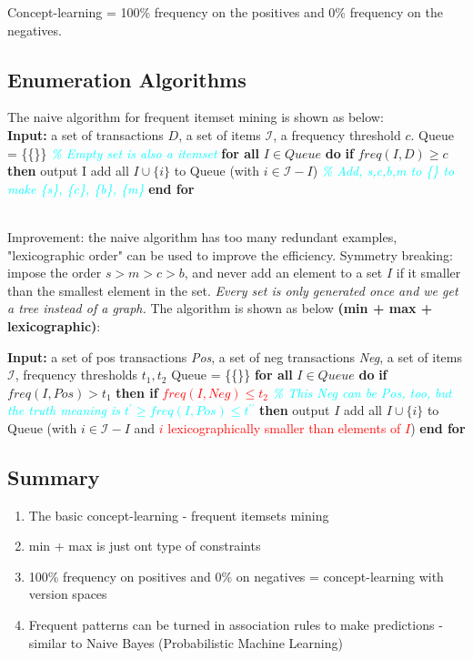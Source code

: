 \noindent
Concept-learning = 100\% frequency on the positives and 0\% frequency on the negatives.

\subsection{Enumeration Algorithms}
The naive algorithm for frequent itemset mining is shown as below: \\
\tabto{0mm} \textbf{Input:}
\tabto{5mm} a set of transactions $D$,
\tabto{5mm} a set of items $\mathscr{I}$,
\tabto{5mm} a frequency threshold $c$.
\tabto{0mm} Queue = \{\{\}\} \textcolor{cyan}{\emph{\% Empty set is also a itemset}}
\tabto{0mm} \textbf{for all} $I \in Queue$ \textbf{do}
\tabto{5mm} \textbf{if} $freq(I,D) \ge c$
\tabto{10mm} \textbf{then} output I
\tabto{10mm} add all $I \cup \{i\}$ to Queue (with $i \in \mathscr{I} - I$) \textcolor{cyan}{\emph{\% Add, s,c,b,m to \{\} to make \{s\}, \{c\}, \{b\}, \{m\}}}
\tabto{0mm} \textbf{end for}

\noindent
\\ Improvement: the naive algorithm has too many redundant examples, "lexicographic order" can be used to improve the efficiency. Symmetry breaking: impose the order $s > m > c > b$, and never add an element to a set $I$ if it smaller than the smallest element in the set. \emph{Every set is only generated once and we get a tree instead of a graph.} The algorithm is shown as below \textbf{(min + max + lexicographic)}:

\tabto{0mm} \textbf{Input:}
\tabto{5mm} a set of pos transactions \emph{Pos},
\tabto{5mm} a set of neg transactions \emph{Neg},
\tabto{5mm} a set of items $\mathscr{I}$,
\tabto{5mm} frequency thresholds $t_{1}, t_{2}$
\tabto{0mm} Queue = \{\{\}\}
\tabto{0mm} \textbf{for all} $I \in Queue$ \textbf{do}
\tabto{5mm} \textbf{if} $freq(I, Pos) > t_{1}$
\tabto{10mm} \textbf{then if} \textcolor{red}{$freq(I, Neg) \le t_{2}$} \textcolor{cyan}{\emph{\% This Neg can be Pos, too, but the truth meaning is $t^{\prime} \ge freq(I, Pos) \le t^{\prime \prime}$}}
\tabto{15mm} \textbf{then} output $I$
\tabto{20mm} add all $I \cup \{i\}$ to Queue (with $i \in \mathscr{I} - I$ and \textcolor{red}{$i$ lexicographically smaller than elements of $I$})
\tabto{0mm} \textbf{end for}

\subsection{Summary}
\begin{enumerate}
    \item The basic concept-learning - frequent itemsets mining
    \item min + max is just  ont type of constraints
    \item 100\% frequency on positives and 0\% on negatives = concept-learning with version spaces
    \item Frequent patterns can be turned in association rules to make predictions - similar to Naive Bayes (Probabilistic Machine Learning)
\end{enumerate}

\pagebreak
